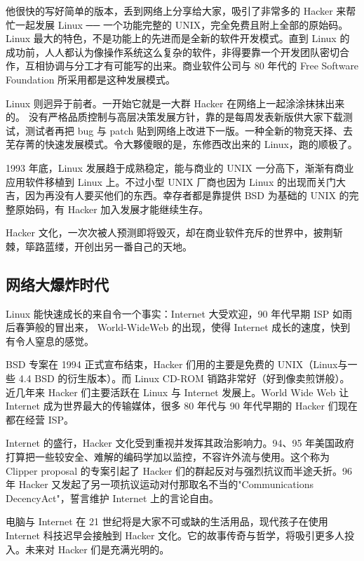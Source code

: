 他很快的写好简单的版本，丢到网络上分享给大家，吸引了非常多的 Hacker 来帮忙一起发展 Linux ── 一个功能完整的 UNIX，完全免费且附上全部的原始码。 Linux 最大的特色，不是功能上的先进而是全新的软件开发模式。直到 Linux 的成功前，人人都认为像操作系统这么复杂的软件，非得要靠一个开发团队密切合作，互相协调与分工才有可能写的出来。商业软件公司与 80 年代的 Free Software Foundation 所采用都是这种发展模式。

Linux 则迥异于前者。一开始它就是一大群 Hacker 在网络上一起涂涂抹抹出来的。 没有严格品质控制与高层决策发展方针，靠的是每周发表新版供大家下载测试，测试者再把 bug 与 patch 贴到网络上改进下一版。一种全新的物竞天择、去芜存菁的快速发展模式。令大夥傻眼的是，东修西改出来的 Linux，跑的顺极了。

1993 年底，Linux 发展趋于成熟稳定，能与商业的 UNIX 一分高下，渐渐有商业应用软件移植到 Linux 上。不过小型 UNIX 厂商也因为 Linux 的出现而关门大吉，因为再没有人要买他们的东西。幸存者都是靠提供 BSD 为基础的 UNIX 的完整原始码，有 Hacker 加入发展才能继续生存。

Hacker 文化，一次次被人预测即将毁灭，却在商业软件充斥的世界中，披荆斩棘，筚路蓝缕，开创出另一番自己的天地。

\subsection{网络大爆炸时代}

Linux 能快速成长的来自令一个事实：Internet 大受欢迎，90 年代早期 ISP 如雨后春笋般的冒出来， World-WideWeb 的出现，使得 Internet 成长的速度，快到有令人窒息的感觉。

BSD 专案在 1994 正式宣布结束，Hacker 们用的主要是免费的 UNIX（Linux与一些 4.4 BSD 的衍生版本）。而 Linux CD-ROM 销路非常好（好到像卖煎饼般）。近几年来 Hacker 们主要活跃在 Linux 与 Internet 发展上。World Wide Web 让 Internet 成为世界最大的传输媒体，很多 80 年代与 90 年代早期的 Hacker 们现在都在经营 ISP。

Internet 的盛行，Hacker 文化受到重视并发挥其政治影响力。94、95 年美国政府打算把一些较安全、难解的编码学加以监控，不容许外流与使用。这个称为 Clipper proposal 的专案引起了 Hacker 们的群起反对与强烈抗议而半途夭折。96 年 Hacker 又发起了另一项抗议运动对付那取名不当的"Communications DecencyAct"，誓言维护 Internet 上的言论自由。

电脑与 Internet 在 21 世纪将是大家不可或缺的生活用品，现代孩子在使用 Internet 科技迟早会接触到 Hacker 文化。它的故事传奇与哲学，将吸引更多人投入。未来对 Hacker 们是充满光明的。
